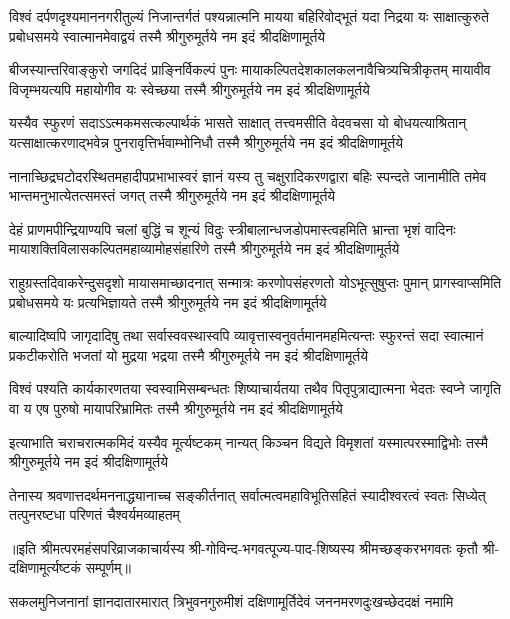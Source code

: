 

\fourlineindentedshloka
{विश्वं दर्पणदृश्यमाननगरीतुल्यं निजान्तर्गतं}
{पश्यन्नात्मनि मायया बहिरिवोद्भूतं यदा निद्रया}
{यः साक्षात्कुरुते प्रबोधसमये स्वात्मानमेवाद्वयं}
{तस्मै श्रीगुरुमूर्तये नम इदं श्रीदक्षिणामूर्तये}

\fourlineindentedshloka
{बीजस्यान्तरिवाङ्कुरो जगदिदं प्राङ्\mbox{}निर्विकल्पं पुनः}
{मायाकल्पितदेशकालकलनावैचित्र्यचित्रीकृतम्}
{मायावीव विजृम्भयत्यपि महायोगीव यः स्वेच्छया}
{तस्मै श्रीगुरुमूर्तये नम इदं श्रीदक्षिणामूर्तये}

\fourlineindentedshloka
{यस्यैव स्फुरणं सदाऽऽत्मकमसत्कल्पार्थकं भासते}
{साक्षात् तत्त्वमसीति वेदवचसा यो बोधयत्याश्रितान्}
{यत्साक्षात्करणाद्भवेन्न पुनरावृत्तिर्भवाम्भोनिधौ}
{तस्मै श्रीगुरुमूर्तये नम इदं श्रीदक्षिणामूर्तये}

\fourlineindentedshloka
{नानाच्छिद्रघटोदरस्थितमहादीपप्रभाभास्वरं}
{ज्ञानं यस्य तु चक्षुरादिकरणद्वारा बहिः स्पन्दते}
{जानामीति तमेव भान्तमनुभात्येतत्समस्तं जगत्}
{तस्मै श्रीगुरुमूर्तये नम इदं श्रीदक्षिणामूर्तये}

\fourlineindentedshloka
{देहं प्राणमपीन्द्रियाण्यपि चलां बुद्धिं च शून्यं विदुः}
{स्त्रीबालान्धजडोपमास्त्वहमिति भ्रान्ता भृशं वादिनः}
{मायाशक्तिविलासकल्पितमहाव्यामोहसंहारिणे}
{तस्मै श्रीगुरुमूर्तये नम इदं श्रीदक्षिणामूर्तये}

\fourlineindentedshloka
{राहुग्रस्तदिवाकरेन्दुसदृशो मायासमाच्छादनात्}
{सन्मात्रः करणोपसंहरणतो योऽभूत्सुषुप्तः पुमान्}
{प्रागस्वाप्समिति प्रबोधसमये यः प्रत्यभिज्ञायते}
{तस्मै श्रीगुरुमूर्तये नम इदं श्रीदक्षिणामूर्तये}

\fourlineindentedshloka
{बाल्यादिष्वपि जागृदादिषु तथा सर्वास्ववस्थास्वपि}
{व्यावृत्तास्वनुवर्तमानमहमित्यन्तः स्फुरन्तं सदा}
{स्वात्मानं प्रकटीकरोति भजतां यो मुद्रया भद्रया}
{तस्मै श्रीगुरुमूर्तये नम इदं श्रीदक्षिणामूर्तये}

\fourlineindentedshloka
{विश्वं पश्यति कार्यकारणतया स्वस्वामिसम्बन्धतः}
{शिष्याचार्यतया तथैव पितृपुत्राद्यात्मना भेदतः}
{स्वप्ने जागृति वा य एष पुरुषो मायापरिभ्रामितः}
{तस्मै श्रीगुरुमूर्तये नम इदं श्रीदक्षिणामूर्तये}

{इत्याभाति चराचरात्मकमिदं यस्यैव मूर्त्यष्टकम्}
{नान्यत् किञ्चन विद्यते विमृशतां यस्मात्परस्माद्विभोः}
{तस्मै श्रीगुरुमूर्तये नम इदं श्रीदक्षिणामूर्तये}

{तेनास्य श्रवणात्तदर्थमननाद्ध्यानाच्च सङ्कीर्तनात्}
{सर्वात्मत्वमहाविभूतिसहितं स्यादीश्वरत्वं स्वतः}
{सिध्येत् तत्पुनरष्टधा परिणतं चैश्वर्यमव्याहतम्}

॥इति श्रीमत्परमहंसपरिव्राजकाचार्यस्य श्री-गोविन्द-भगवत्पूज्य-पाद-शिष्यस्य
श्रीमच्छङ्करभगवतः कृतौ श्री-दक्षिणामूर्त्यष्टकं सम्पूर्णम्॥

\closesection
{}
{सकलमुनिजनानां ज्ञानदातारमारात्}
{त्रिभुवनगुरुमीशं दक्षिणामूर्तिदेवं}
{जननमरणदुःखच्छेददक्षं नमामि}